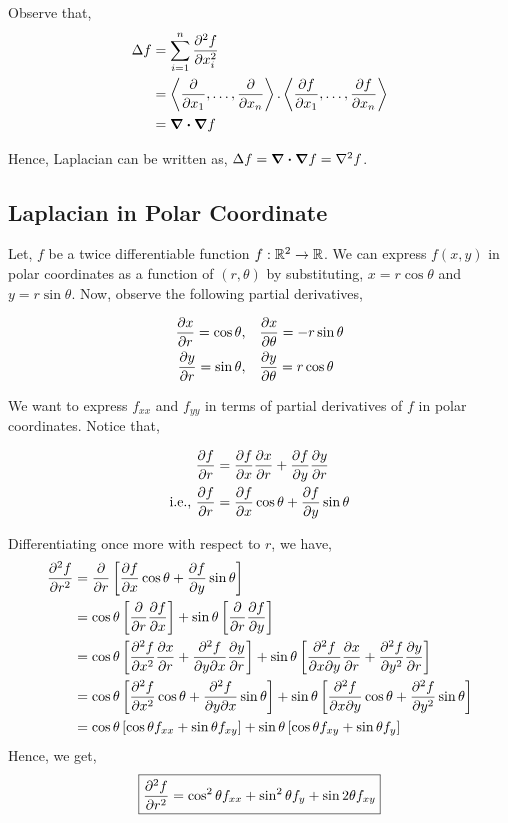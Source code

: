 \documentclass[../Analysis-3.tex]{subfiles}
\begin{document}
Observe that,  \begin{align*}
  \Delta f
   & = \sum_{i=1}^{n} \pdv[2]{f}{x_i}                                                                                               \\
   & = \left\langle \pdv{}{x_1}, \ldots, \pdv{}{x_n}  \right\rangle. \left\langle \pdv{f}{x_1}, \ldots, \pdv{f}{x_n}  \right\rangle \\
   & = \div\grad f
\end{align*}

Hence, Laplacian can be written as, $\Delta f = \div\grad f = \laplacian f$.

\subsection*{Laplacian in Polar Coordinate}

Let, $f$ be a twice differentiable function $f: \mathbb{R}^2 \to \mathbb{R}$. We can express $f(x, y)$ in polar coordinates as a function of $(r, \theta)$ by substituting, $x = r\cos{\theta}$ and $y= r\sin{\theta}$. Now, observe the following partial derivatives,

\begin{align*}
  \pdv{x}{r} = \cos{\theta}, \quad & \pdv{x}{\theta} = -r\sin{\theta} \\
  \pdv{y}{r} = \sin{\theta}, \quad & \pdv{y}{\theta} = r\cos{\theta}
\end{align*}

We want to express $f_{xx}$ and $f_{yy}$ in terms of partial derivatives of $f$ in polar coordinates. Notice that,

\begin{align*}
                & \pdv{f}{r} = \pdv{f}{x} \pdv{x}{r} + \pdv{f}{y}\pdv{y}{r}     \\
  \text{i.e., } & \pdv{f}{r} = \pdv{f}{x} \cos{\theta} + \pdv{f}{y}\sin{\theta}
\end{align*}

Differentiating once more with respect to $r$, we have,
\begin{align*}
  \pdv[2]{f}{r}
   & = \pdv{}{r} \left[\pdv{f}{x} \cos{\theta} + \pdv{f}{y} \sin{\theta} \right]                                                                                               \\
   & = \cos{\theta} \left[\pdv{}{r} \pdv{f}{x}\right] + \sin{\theta} \left[\pdv{}{r} \pdv{f}{y} \right]                                                                        \\
   & = \cos{\theta} \left[\pdv[2]{f}{x} \pdv{x}{r} + \pdv{f}{y}{x} \pdv{y}{r} \right] + \sin{\theta} \left[\pdv{f}{x}{y} \pdv{x}{r} + \pdv[2]{f}{y} \pdv{y}{r} \right]         \\
   & = \cos{\theta} \left[\pdv[2]{f}{x} \cos{\theta} + \pdv{f}{y}{x} \sin{\theta} \right] + \sin{\theta} \left[\pdv{f}{x}{y} \cos{\theta} + \pdv[2]{f}{y} \sin{\theta} \right] \\
   & = \cos{\theta} \left[\cos{\theta} f_{xx} + \sin{\theta} f_{xy} \right] + \sin{\theta} \left[\cos{\theta} f_{xy} + \sin{\theta} f_{y} \right]
\end{align*}
Hence, we get,
\[
  \boxed{\pdv[2]{f}{r} = \cos^2 \theta f_{xx} + \sin^2 \theta f_{y} + \sin 2 \theta f_{xy}}
\]
\end{document}
